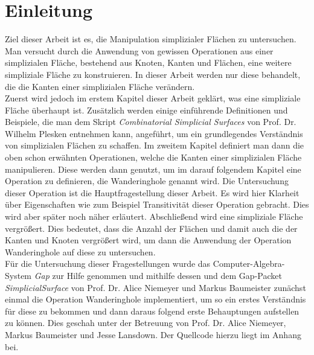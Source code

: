 \documentclass[12pt,titlepage,twoside,cleardoublepage]{article}
\theoremstyle{nummermitklammern}
\numberwithin{equation}{section}
\begin{document}
\section{Einleitung}
Ziel dieser Arbeit ist es, die Manipulation simplizialer Flächen zu untersuchen. Man versucht durch die Anwendung von gewissen Operationen aus einer simplizialen Fläche, bestehend aus Knoten, Kanten und Flächen, eine weitere simpliziale Fläche zu konstruieren. In dieser Arbeit werden nur diese behandelt, die die Kanten einer simplizialen Fläche verändern.\\
Zuerst wird jedoch im erstem Kapitel dieser Arbeit geklärt, was eine simpliziale Fläche überhaupt ist. Zusätzlich werden einige einführende Definitionen und Beispiele, die man dem Skript \emph{Combinatorial Simplicial Surfaces} von Prof. Dr. Wilhelm Plesken entnehmen kann, angeführt, um ein grundlegendes Verständnis von simplizialen Flächen zu schaffen. Im zweitem Kapitel definiert man dann die oben schon erwähnten Operationen, welche die Kanten einer simplizialen Fläche manipulieren. Diese werden dann genutzt, um im darauf folgendem Kapitel eine Operation zu definieren, die Wanderinghole genannt wird. Die Untersuchung dieser Operation ist die Hauptfragestellung dieser Arbeit. Es wird hier Klarheit über Eigenschaften wie zum Beispiel Transitivität dieser Operation gebracht. Dies wird aber später noch näher erläutert. Abschließend wird eine simpliziale Fläche vergrößert. Dies bedeutet, dass die Anzahl der Flächen und damit auch die der Kanten und Knoten vergrößert wird, um dann die Anwendung der Operation Wanderinghole auf diese zu untersuchen. \\
Für die Untersuchung dieser Fragestellungen wurde das Computer-Algebra-System \emph{Gap} zur Hilfe genommen und mithilfe dessen und dem Gap-Packet \emph{SimplicialSurface} von Prof. Dr. Alice Niemeyer und Markus Baumeister zunächst einmal die Operation Wanderinghole implementiert, um so ein erstes Verständnis für diese zu bekommen und dann daraus folgend erste Behauptungen aufstellen zu können. Dies geschah unter der Betreuung von Prof. Dr. Alice Niemeyer, Markus Baumeister und Jesse Lansdown. Der Quellcode hierzu liegt im Anhang bei. 
\newpage
\newpage
\end{document}
